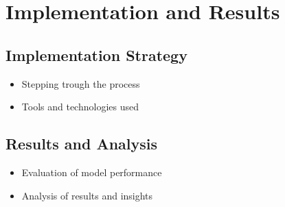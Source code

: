 \chapter{Implementation and Results}

\section{Implementation Strategy}
\begin{itemize}
    \item Stepping trough the process
    \item Tools and technologies used
\end{itemize}

\section{Results and Analysis}
\begin{itemize}
    \item Evaluation of model performance
    \item Analysis of results and insights
\end{itemize}